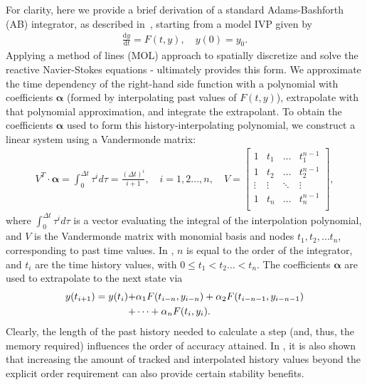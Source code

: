 For clarity, here we provide a brief derivation of a standard Adams-Bashforth (AB)
integrator, as described in~\cite{bashforth1883attempt}, starting from a model IVP
given by
\begin{align}
\frac{\text{d}y}{\text{d}t} = F(t,y), \quad y(0) = y_{0}. \label{eq:ivp}
\end{align}
Applying a method of lines (MOL) approach to spatially discretize and solve
the reactive Navier-Stokes equations  -  ultimately
provides this form. We approximate the time dependency of the right-hand side function
with a polynomial with coefficients $\boldsymbol{\alpha}$ (formed by interpolating past
values of $F(t,y)$), extrapolate with that polynomial approximation, and integrate
the extrapolant. To obtain the coefficients $\boldsymbol{\alpha}$ used to form this
history-interpolating polynomial, we construct a linear system using a Vandermonde matrix:
\begin{align}
V^{T} \cdot \boldsymbol{\alpha} = \int_0^{\Delta t} \tau^{i} d\tau = \frac{(\Delta t)^{i}}{i+1}, \quad i = 1,2...,n, \quad V = \begin{bmatrix}
    1 & t_{1} &  \hdots   & t_{1}^{n-1}  \\
    1 & t_{2} & \hdots &  t_{2}^{n-1} \\
      \vdots  & \vdots  &  \ddots   &  \vdots   \\
       1 &   t_{n}  &  \hdots  & t_{n}^{n-1} \\
        \end{bmatrix}, \label{eq:vandermonde}
\end{align}
where $\int_0^{\Delta t} \tau^{i} d\tau$ is a vector evaluating the integral of
the interpolation polynomial, and $V$ is the Vandermonde matrix with monomial
basis and nodes $t_{1}, t_{2}, \hdots t_{n}$, corresponding to past time
values. In , $n$ is equal to the order of the integrator,
and $t_{i}$ are the time history values, with $0 \leq t_{1} < t_{2} \hdots <
t_{n}$.  The coefficients $\boldsymbol{\alpha}$ are used to extrapolate to the
next state via
\begin{align}
y(t_{i+1}) = y(t_{i}) +& \alpha_{1}F(t_{i-n},y_{i-n}) + \alpha_{2}F(t_{i-n-1},y_{i-n-1}) \notag \\
+& \cdots + \alpha_{n}F(t_{i},y_{i}). \label{eq:ab_general}
\end{align}
Clearly, the length of the past history needed to calculate a step (and, thus,
the memory required) influences the order of accuracy attained. In \cite{mikida2019multi},
it is also shown that increasing the amount of tracked and interpolated history
values beyond the explicit order requirement can also provide certain stability
benefits.

